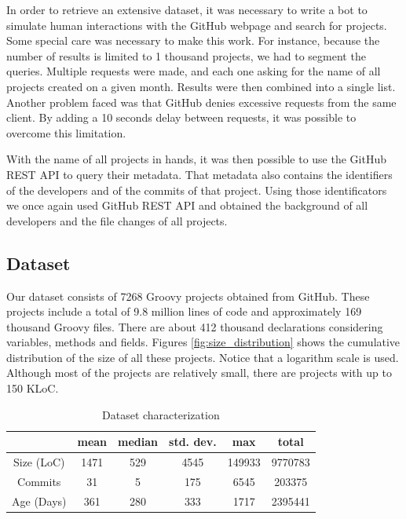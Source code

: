 \documentclass[preprint]{sigplanconf}
\renewcommand{\arraystretch}{1.2}
\begin{document}
In order to retrieve an extensive dataset, it was necessary to write a bot to simulate human interactions with the GitHub webpage and search for projects. 
Some special care was necessary to make this work. 
For instance, because the number of results is limited to 1 thousand projects, we had to segment the queries.
Multiple requests were made, and each one asking for the name of all projects created on a given month.
Results were then combined into a single list.
Another problem faced was that GitHub denies excessive requests from the same client.
By adding a 10 seconds delay between requests, it was possible to overcome this limitation.

With the name of all projects in hands, it was then possible to use the GitHub REST API to query their metadata.
That metadata also contains the identifiers of the developers and of the commits of that project.
Using those identificators we once again used GitHub REST API and obtained the background of all developers and the file changes of all projects.


\subsection{Dataset\label{dataset}}


Our dataset consists of 7268 Groovy projects obtained from GitHub. 
These projects include a total of 9.8 million lines of code and approximately 169 thousand Groovy files. 
There are about 412 thousand declarations considering variables, methods and fields. 
Figures \ref{fig:size_distribution} shows the cumulative distribution of the size of all these projects.
Notice that a logarithm scale is used.
Although most of the projects are relatively small, there are projects with up to 150 KLoC. 

\begin{table}[h!]

\centering{}%
\renewcommand{\arraystretch}{1.2}

\begin{tabular}{|c|c|c|c|c|c|}
\hline
{}		& mean	& median	& std. dev.	& max	& total		\\
\hline
\hline
Size (LoC)	& 1471 	& 529  & 4545  & 149933	& 9770783	\\ \hline
Commits   	& 31  	& 5    & 175   & 6545		& 203375	\\ \hline
Age (Days)  & 361  	& 280  & 333   & 1717		& 2395441	\\ \hline
\end{tabular}
\caption{Dataset characterization}
\label{tab:dataset_characterization}
\end{table}
\end{document}
